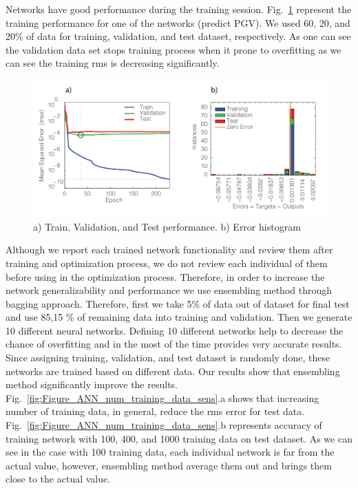 Networks have good performance during the training session. Fig.~\ref{fig:Figure_training_performance} represent the training performance for one of the networks (predict PGV). We used 60, 20, and 20\% of data for training, validation, and test dataset, respectively.  As one can see the validation data set stops training process when it prone to overfitting as we can see the training rms is decreasing significantly. 

  \begin{figure}[ht]
    \centering
    \includegraphics[width=\textwidth]{figures/pdf/Figure_training_performance.pdf}
    \caption{a) Train, Validation, and Test performance. b) Error histogram}
    \label{fig:Figure_training_performance}
\end{figure}

Although we report each trained network functionality and review them after training and optimization process, we do not review each individual of them before using in the optimization process. Therefore, in order to increase the network generalizability and performance we use ensembling method through bagging approach. Therefore, first we take 5\% of data out of dataset for final test and use  85,15 \% of remaining data into training and validation. Then we generate 10 different neural networks. Defining 10 different networks help to decrease the chance of overfitting and in the most of the time provides very accurate results.  Since assigning training, validation, and test dataset is randomly done, these networks are trained based on different data. Our results show that ensembling method significantly improve the results. Fig.~\ref{fig:Figure_ANN_num_training_data_sens}.a shows that increasing number of training data, in general, reduce the rms error for test data. Fig.~\ref{fig:Figure_ANN_num_training_data_sens}.b represents accuracy of training network with 100, 400, and 1000 training data on test dataset. As we can see in the case with 100 training data, each individual network is far from the actual value, however, ensembling method average them out and brings them close to the actual value. 

